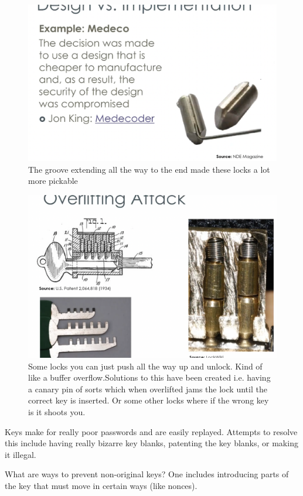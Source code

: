 \documentclass[../notes.tex]{subfiles}
\begin{document}
\begin{figure}[H]
    \centering
    \includegraphics[width=0.8\linewidth]{img/image_2023-04-16-21-04-33.png}
    \caption{The groove extending all the way to the end made these locks a lot more pickable}
\end{figure}



\begin{figure}[H]
    \centering
    \includegraphics[width=0.8\linewidth]{img/image_2023-04-16-21-07-04.png}
    \caption{Some locks you can just push all the way up and unlock. Kind of like a buffer overflow.Solutions to this have been created i.e. having a canary pin of sorts which when overlifted jams the lock until the correct key is inserted. Or some other locks where if the wrong key is it shoots you.}
\end{figure}


Keys make for really poor passwords and are easily replayed. Attempts to resolve this include having really bizarre key blanks, patenting the key blanks, or making it illegal.

What are ways to prevent non-original keys? One includes introducing parts of the key that must move in certain ways (like nonces).
\end{document}
